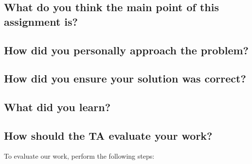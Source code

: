 \documentclass[letterpaper,10pt,titlepage]{article}
\begin{document}
\subsection{What do you think the main point of this assignment is?}


\subsection{How did you personally approach the problem?}


\subsection{How did you ensure your solution was correct?}


\subsection{What did you learn?}


\subsection{How should the TA evaluate your work?}
To evaluate our work, perform the following steps:

\begin{enumerate}

\end{enumerate}






%
%
%
\end{document}
